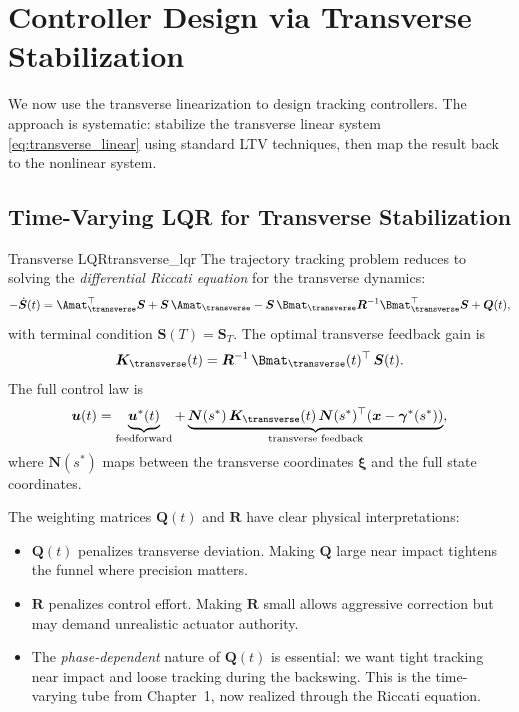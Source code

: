 \documentclass[12pt, openany]{book}
\theoremstyle{plain}
\newcommand{\state}{\bm{x}}
\newcommand{\control}{\bm{u}}
\newcommand{\traj}{\bm{\gamma}}
\begin{document}
\section{Controller Design via Transverse Stabilization}

We now use the transverse linearization to design tracking controllers.
The approach is systematic: stabilize the transverse linear system
\eqref{eq:transverse_linear} using standard LTV techniques, then map
the result back to the nonlinear system.

\subsection{Time-Varying LQR for Transverse Stabilization}

\begin{principle}{Transverse LQR}{transverse_lqr}
  The trajectory tracking problem reduces to solving the \emph{differential
  Riccati equation} for the transverse dynamics:
  \begin{equation}\label{eq:riccati}
    -\dot{\bm{S}}(t) = \Amat_\transverse^\top \bm{S}
    + \bm{S}\, \Amat_\transverse
    - \bm{S}\, \Bmat_\transverse \bm{R}^{-1} \Bmat_\transverse^\top \bm{S}
    + \bm{Q}(t),
  \end{equation}
  with terminal condition $\bm{S}(T) = \bm{S}_T$. The optimal transverse
  feedback gain is
  \begin{equation}
    \bm{K}_\transverse(t) = \bm{R}^{-1}\, \Bmat_\transverse(t)^\top\, \bm{S}(t).
  \end{equation}
  The full control law is
  \begin{equation}\label{eq:full_control_law}
    \control(t) = \underbrace{\control^*(t)}_{\text{feedforward}}
    + \underbrace{\bm{N}(s^*)\, \bm{K}_\transverse(t)\,
    \bm{N}(s^*)^\top (\state - \traj^*(s^*))}_{\text{transverse feedback}},
  \end{equation}
  where $\bm{N}(s^*)$ maps between the transverse coordinates $\bm{\xi}$
  and the full state coordinates.
\end{principle}

The weighting matrices $\bm{Q}(t)$ and $\bm{R}$ have clear physical
interpretations:
\begin{itemize}[leftmargin=1.5cm]
  \item $\bm{Q}(t)$ penalizes transverse deviation. Making $\bm{Q}$ large
    near impact tightens the funnel where precision matters.
  \item $\bm{R}$ penalizes control effort. Making $\bm{R}$ small allows
    aggressive correction but may demand unrealistic actuator authority.
  \item The \emph{phase-dependent} nature of $\bm{Q}(t)$ is essential:
    we want tight tracking near impact and loose tracking during the backswing.
    This is the time-varying tube from Chapter~1, now realized through the
    Riccati equation.
\end{itemize}
\end{document}
